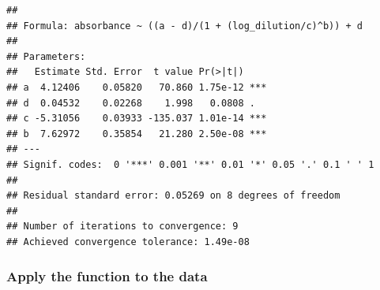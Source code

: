 \documentclass[
]{book}
\newenvironment{Shaded}{\begin{snugshade}}{\end{snugshade}}
\newcommand{\AttributeTok}[1]{\textcolor[rgb]{0.77,0.63,0.00}{#1}}
\newcommand{\FunctionTok}[1]{\textcolor[rgb]{0.00,0.00,0.00}{#1}}
\newcommand{\NormalTok}[1]{#1}
\newcommand{\OtherTok}[1]{\textcolor[rgb]{0.56,0.35,0.01}{#1}}
\newcommand{\SpecialCharTok}[1]{\textcolor[rgb]{0.00,0.00,0.00}{#1}}
\newcommand{\StringTok}[1]{\textcolor[rgb]{0.31,0.60,0.02}{#1}}
\begin{document}
\begin{verbatim}
## 
## Formula: absorbance ~ ((a - d)/(1 + (log_dilution/c)^b)) + d
## 
## Parameters:
##   Estimate Std. Error  t value Pr(>|t|)    
## a  4.12406    0.05820   70.860 1.75e-12 ***
## d  0.04532    0.02268    1.998   0.0808 .  
## c -5.31056    0.03933 -135.037 1.01e-14 ***
## b  7.62972    0.35854   21.280 2.50e-08 ***
## ---
## Signif. codes:  0 '***' 0.001 '**' 0.01 '*' 0.05 '.' 0.1 ' ' 1
## 
## Residual standard error: 0.05269 on 8 degrees of freedom
## 
## Number of iterations to convergence: 9 
## Achieved convergence tolerance: 1.49e-08
\end{verbatim}

\hypertarget{apply-the-function-to-the-data}{%
\subsubsection{Apply the function to the data}\label{apply-the-function-to-the-data}}

\begin{Shaded}
\end{Shaded}
\end{document}

